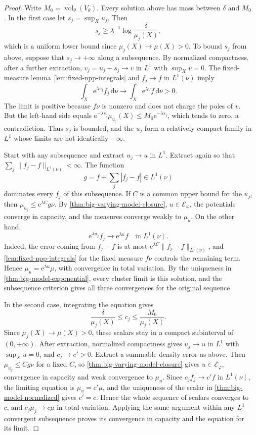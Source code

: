 \begin{proof}
Write $M_0=\overline{\operatorname{vol}}_\theta(V_\theta)$. Every solution above has mass between $\delta$ and $M_0$. In the first case let $s_j=\sup_Xu_j$. Then
\[
 s_j\geq\lambda^{-1}\log\frac{\delta}{\mu_j(X)},
\]
which is a uniform lower bound since $\mu_j(X)\to\mu(X)>0$. To bound $s_j$ from above, suppose that $s_j\to+\infty$ along a subsequence. By normalized compactness, after a further extraction, $v_j=u_j-s_j\to v$ in $L^1$ with $\sup_Xv=0$. The fixed-measure lemma \cref{lem:fixed-npp-integrals} and $f_j\to f$ in $L^1(\nu)$ imply
\[
 \int_X\mathrm{e}^{\lambda v_j}f_j\,\mathrm{d}\nu
 \longrightarrow\int_X\mathrm{e}^{\lambda v}f\,\mathrm{d}\nu>0.
\]
The limit is positive because $f\nu$ is nonzero and does not charge the poles of $v$. But the left-hand side equals $\mathrm{e}^{-\lambda s_j}\mu_{u_j}(X)\leq M_0\mathrm{e}^{-\lambda s_j}$, which tends to zero, a contradiction. Thus $s_j$ is bounded, and the $u_j$ form a relatively compact family in $L^1$ whose limits are not identically $-\infty$.

Start with any subsequence and extract $u_j\to u$ in $L^1$. Extract again so that $\sum_j\|f_j-f\|_{L^1(\nu)}<\infty$. The function
\[
 g=f+\sum_j|f_j-f|\in L^1(\nu)
\]
dominates every $f_j$ of this subsequence. If $C$ is a common upper bound for the $u_j$, then $\mu_{u_j}\leq\mathrm{e}^{\lambda C}g\nu$. By \cref{thm:big-varying-model-closure}, $u\in\mathcal E_\varphi$, the potentials converge in capacity, and the measures converge weakly to $\mu_u$. On the other hand,
\[
 \mathrm{e}^{\lambda u_j}f_j\longrightarrow
 \mathrm{e}^{\lambda u}f\quad\text{in }L^1(\nu).
\]
Indeed, the error coming from $f_j-f$ is at most $\mathrm{e}^{\lambda C}\|f_j-f\|_{L^1(\nu)}$, and \cref{lem:fixed-npp-integrals} for the fixed measure $f\nu$ controls the remaining term. Hence $\mu_u=\mathrm{e}^{\lambda u}\mu$, with convergence in total variation. By the uniqueness in \cref{thm:big-model-exponential}, every cluster limit is this solution, and the subsequence criterion gives all three convergences for the original sequence.

In the second case, integrating the equation gives
\[
 \frac{\delta}{\mu_j(X)}\leq c_j\leq\frac{M_0}{\mu_j(X)}.
\]
Since $\mu_j(X)\to\mu(X)>0$, these scalars stay in a compact subinterval of $(0,+\infty)$. After extraction, normalized compactness gives $u_j\to u$ in $L^1$ with $\sup_Xu=0$, and $c_j\to c'>0$. Extract a summable density error as above. Then $\mu_{u_j}\leq Cg\nu$ for a fixed $C$, so \cref{thm:big-varying-model-closure} gives $u\in\mathcal E_\varphi$, convergence in capacity and weak convergence to $\mu_u$. Since $c_jf_j\to c'f$ in $L^1(\nu)$, the limiting equation is $\mu_u=c'\mu$, and the uniqueness of the scalar in \cref{thm:big-model-normalized} gives $c'=c$. Hence the whole sequence of scalars converges to $c$, and $c_j\mu_j\to c\mu$ in total variation. Applying the same argument within any $L^1$-convergent subsequence proves its convergence in capacity and the equation for its limit.
\end{proof}
